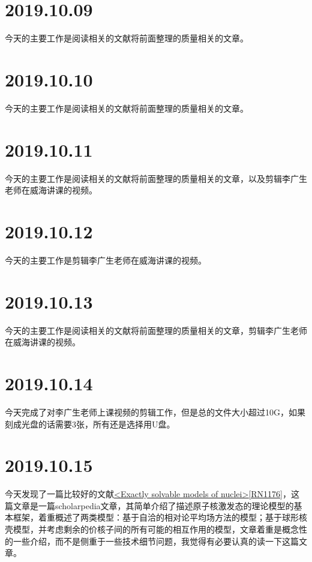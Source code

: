 \section{2019.10.09}
今天的主要工作是阅读相关的文献将前面整理的质量相关的文章。

\section{2019.10.10}
今天的主要工作是阅读相关的文献将前面整理的质量相关的文章。

\section{2019.10.11}
今天的主要工作是阅读相关的文献将前面整理的质量相关的文章，以及剪辑李广生老师在威海讲课的视频。

\section{2019.10.12}
今天的主要工作是剪辑李广生老师在威海讲课的视频。

\section{2019.10.13}
今天的主要工作是阅读相关的文献将前面整理的质量相关的文章，剪辑李广生老师在威海讲课的视频。

\section{2019.10.14}
今天完成了对李广生老师上课视频的剪辑工作，但是总的文件大小超过10G，如果刻成光盘的话需要3张，所有还是选择用U盘。

\section{2019.10.15}
今天发现了一篇比较好的文献\href{https://www.doi.org/10.4249/scholarpedia.31279}{<Exactly solvable models of nuclei>}\ref{RN1176}，这篇文章是一篇scholarpedia文章，其简单介绍了描述原子核激发态的理论模型的基本框架，着重概述了两类模型：基于自洽的相对论平均场方法的模型；基于球形核壳模型，并考虑剩余的价核子间的所有可能的相互作用的模型，文章着重是概念性的一些介绍，而不是侧重于一些技术细节问题，我觉得有必要认真的读一下这篇文章。